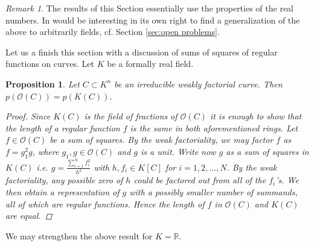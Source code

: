 \documentclass[12pt,reqno]{amsart}   	%
\newtheorem{prop}[thm]{Proposition}
\theoremstyle{obs}
\theoremstyle{prob}
\theoremstyle{conj}
\theoremstyle{remark}
\newtheorem{remark}[thm]{Remark}
\newcommand{\R}{\mathbb{R}}
\newcommand{\OO}{\mathcal{O}}
\begin{document}
\begin{remark}
The results of this Section essentially use the properties of the real numbers. In would be interesting in its own right to find a generalization of the above to arbitrarily fields, cf. Section \ref{sec:open problems}.
\end{remark}


Let us a finish this section with a discussion of sums of squares of regular functions on curves. Let $K$ be a formally real field.

\begin{prop}\label{p_2O=p_2K}
Let $C \subset K^n$ be an irreducible weakly factorial curve. Then $p(\OO(C))=p(K(C))$.


\begin{proof}
Since $K(C)$ is the field of fractions of $\OO(C)$ it is enough to show that the length of a regular function $f$ is the same in both aforementioned rings.  Let $f \in \OO(C)$ be a sum of squares. By the weak factoriality, we may factor $f$ as $f=g_1^2g$, where $g_1,g \in \OO(C)$ and $g$ is a unit. Write now $g$ as a sum of squares in $K(C)$ i.e. $g=\frac{\sum_{i=1}^Nf_i^2}{h^2}$ with $h,f_i \in K[C]$ for $i=1,2, \dots ,N$. By the weak factoriality, any possible zero of $h$ could be factored out from all of the $f_i$'s. We then obtain a representation of $g$ with a possibly smaller number of summands, all of which are regular functions. Hence the length of $f$ in $\OO(C)$ and $K(C)$ are equal.

\end{proof}

\end{prop}

We may strengthen the above result for $K=\R$.
\end{document}
